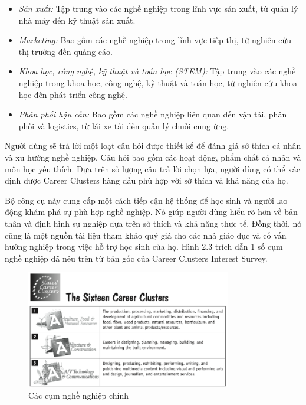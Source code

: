 \begin{itemize}
    \item \textit{Sản xuất:} Tập trung vào các nghề nghiệp trong lĩnh vực sản xuất, từ quản lý nhà máy đến kỹ thuật sản xuất.
    \item \textit{Marketing:} Bao gồm các nghề nghiệp trong lĩnh vực tiếp thị, từ nghiên cứu thị trường đến quảng cáo.
    \item \textit{Khoa học, công nghệ, kỹ thuật và toán học (STEM):} Tập trung vào các nghề nghiệp trong khoa học, công nghệ, kỹ thuật và toán học, từ nghiên cứu khoa học đến phát triển công nghệ.
    \item \textit{Phân phối hậu cần:} Bao gồm các nghề nghiệp liên quan đến vận tải, phân phối và logistics, từ lái xe tải đến quản lý chuỗi cung ứng.
\end{itemize}

Người dùng sẽ trả lời một loạt câu hỏi được thiết kế để đánh giá sở thích cá nhân và xu hướng nghề nghiệp. Câu hỏi bao gồm các hoạt động, phẩm chất cá nhân và môn học yêu thích. Dựa trên số lượng câu trả lời chọn lựa, người dùng có thể xác định được Career Clusters hàng đầu phù hợp với sở thích và khả năng của họ. 

Bộ công cụ này cung cấp một cách tiếp cận hệ thống để học sinh và người lao động khám phá sự phù hợp nghề nghiệp. Nó giúp người dùng hiểu rõ hơn về bản thân và định hình sự nghiệp dựa trên sở thích và khả năng thực tế. Đồng thời, nó cũng là một nguồn tài liệu tham khảo quý giá cho các nhà giáo dục và cố vấn hướng nghiệp trong việc hỗ trợ học sinh của họ. Hình 2.3 trích dẫn 1 số cụm nghề nghiệp đã nêu trên từ bản gốc của Career Clusters Interest Survey.

\begin{figure}[H]
    \centering
    \includegraphics[width=0.8\textwidth]{images/chap2/CC.png}
    \vspace{0.6cm}
    \caption{Các cụm nghề nghiệp chính}
\end{figure}

